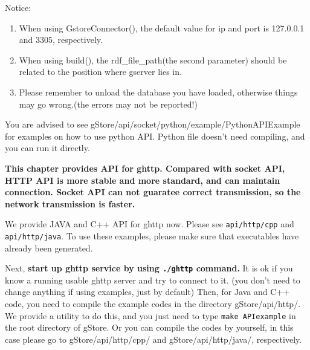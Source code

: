 \documentclass[titlepage, a4paper, 12pt]{article}
\begin{document}
	Notice:
	
	\begin{enumerate}
		\item
		When using GstoreConnector(), the default value for ip and port is
		127.0.0.1 and 3305, respectively.
		\item
		When using build(), the rdf\_file\_path(the second parameter) should
		be related to the position where gserver lies in.
		\item
		Please remember to unload the database you have loaded, otherwise
		things may go wrong.(the errors may not be reported!)
	\end{enumerate}
	
	
	You are advised to see gStore/api/socket/python/example/PythonAPIExample for examples on how to use python API. Python file doesn't need compiling, and you can run it directly.

\clearpage



\textbf{This chapter provides API for ghttp. Compared with socket API, HTTP API is more stable and more standard, and can maintain connection. Socket API can not guaratee correct transmission, so the network transmission is faster.}


We provide JAVA and C++ API for ghttp now. Please see \texttt{api/http/cpp} and \texttt{api/http/java}. To use these examples, please make sure that executables have already been generated.

Next, \textbf{start up ghttp service by using \texttt{./ghttp} command.} It is ok if you know a running usable ghttp server and try to connect to it. (you don't need to change anything if using
examples, just by default) Then, for Java and C++ code, you need to compile the example codes in the directory gStore/api/http/. We provide a utility to do this, and you just need to type \texttt{make\ APIexample} in the root directory of gStore. Or you can compile the codes by yourself, in this case please go to gStore/api/http/cpp/ and gStore/api/http/java/, respectively.
\end{document}
